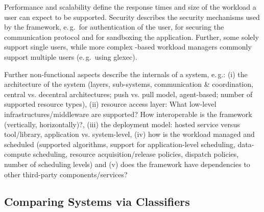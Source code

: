 \documentclass{sig-alternate}
\begin{document}
 Performance and scalability define the
response times and size of the workload a user can expect to be
supported.  Security describes the security mechanisms used by the
framework, e.\,g.\ for authentication of the user, for securing the
communication protocol and for sandboxing the application.  Further,
some \pilotjobs solely support single users, while more complex
\pilot-based workload managers commonly support multiple users
(e.\,g.\ using glexec).

Further non-functional aspects describe the internals of a \pilotjob system,
e.\,g.: (i) the architecture of the system (layers, sub-systems,
communication \& coordination, central vs. decentral architectures; push vs.
pull model, agent-based; number of supported resource types), (ii) resource
access layer: What low-level infrastructures/middleware are supported? How
interoperable is the framework (vertically, horizontally)?, (iii) the
deployment model: hosted service versus tool/library, application vs.
system-level, (iv) how is the workload managed and scheduled (supported
algorithms, support for application-level scheduling, data-compute scheduling,
resource acquisition/release policies, dispatch policies, number of scheduling
levels) and (v) does the framework have dependencies to other third-party
components/services?

\subsection{Comparing \pilot Systems via Classifiers}

\end{document}
